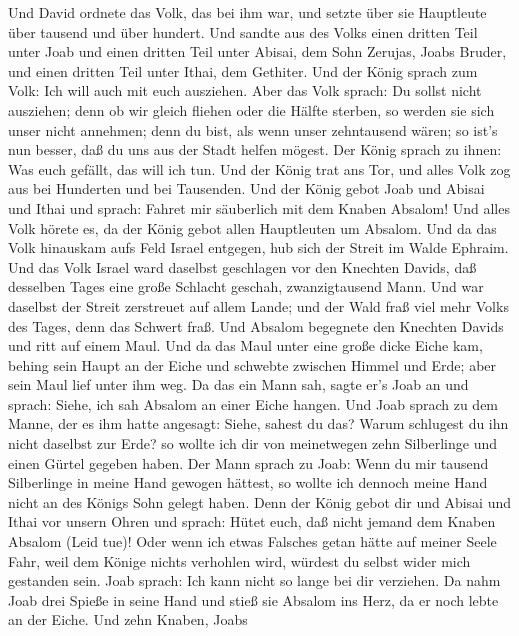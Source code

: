  Und David ordnete das Volk, das bei ihm war, und setzte
über sie Hauptleute über tausend und über hundert.  Und
sandte aus des Volks einen dritten Teil unter Joab und einen dritten
Teil unter Abisai, dem Sohn Zerujas, Joabs Bruder, und einen dritten
Teil unter Ithai, dem Gethiter. Und der König sprach zum Volk: Ich will
auch mit euch ausziehen.  Aber das Volk sprach: Du sollst
nicht ausziehen; denn ob wir gleich fliehen oder die Hälfte sterben, so
werden sie sich unser nicht annehmen; denn du bist, als wenn unser
zehntausend wären; so ist's nun besser, daß du uns aus der Stadt helfen
mögest.  Der König sprach zu ihnen: Was euch gefällt, das
will ich tun. Und der König trat ans Tor, und alles Volk zog aus bei
Hunderten und bei Tausenden.  Und der König gebot Joab und
Abisai und Ithai und sprach: Fahret mir säuberlich mit dem Knaben
Absalom! Und alles Volk hörete es, da der König gebot allen Hauptleuten
um Absalom.  Und da das Volk hinauskam aufs Feld Israel
entgegen, hub sich der Streit im Walde Ephraim.  Und das
Volk Israel ward daselbst geschlagen vor den Knechten Davids, daß
desselben Tages eine große Schlacht geschah, zwanzigtausend Mann.
 Und war daselbst der Streit zerstreuet auf allem Lande; und
der Wald fraß viel mehr Volks des Tages, denn das Schwert fraß.
 Und Absalom begegnete den Knechten Davids und ritt auf
einem Maul. Und da das Maul unter eine große dicke Eiche kam, behing
sein Haupt an der Eiche und schwebte zwischen Himmel und Erde; aber sein
Maul lief unter ihm weg.  Da das ein Mann sah, sagte er's
Joab an und sprach: Siehe, ich sah Absalom an einer Eiche hangen.
 Und Joab sprach zu dem Manne, der es ihm hatte angesagt:
Siehe, sahest du das? Warum schlugest du ihn nicht daselbst zur Erde? so
wollte ich dir von meinetwegen zehn Silberlinge und einen Gürtel gegeben
haben.  Der Mann sprach zu Joab: Wenn du mir tausend
Silberlinge in meine Hand gewogen hättest, so wollte ich dennoch meine
Hand nicht an des Königs Sohn gelegt haben. Denn der König gebot dir und
Abisai und Ithai vor unsern Ohren und sprach: Hütet euch, daß nicht
jemand dem Knaben Absalom (Leid tue)!  Oder wenn ich etwas
Falsches getan hätte auf meiner Seele Fahr, weil dem Könige nichts
verhohlen wird, würdest du selbst wider mich gestanden sein.
 Joab sprach: Ich kann nicht so lange bei dir verziehen. Da
nahm Joab drei Spieße in seine Hand und stieß sie Absalom ins Herz, da
er noch lebte an der Eiche.  Und zehn Knaben, Joabs
